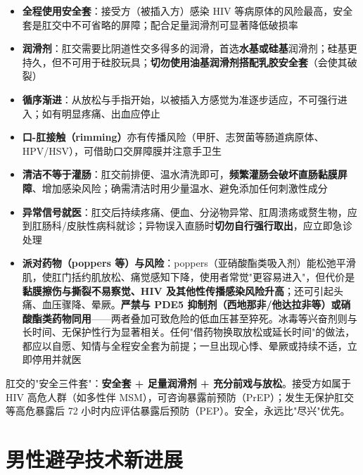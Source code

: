 \documentclass[12pt,a4paper,twoside]{ctexbook}
\begin{document}
\begin{itemize}[leftmargin=2cm]
	\item \textbf{全程使用安全套}：接受方（被插入方）感染 HIV 等病原体的风险最高，安全套是肛交中不可省略的屏障；配合足量润滑剂可显著降低破损率
	\item \textbf{润滑剂}：肛交需要比阴道性交多得多的润滑，首选\textbf{水基或硅基}润滑剂；硅基更持久，但不可用于硅胶玩具；\textbf{切勿使用油基润滑剂搭配乳胶安全套}（会使其破裂）
	\item \textbf{循序渐进}：从放松与手指开始，以被插入方感觉为准逐步适应，不可强行进入；如有明显疼痛、出血应停止
	\item \textbf{口-肛接触（rimming）}亦有传播风险（甲肝、志贺菌等肠道病原体、HPV/HSV），可借助口交屏障膜并注意手卫生
	\item \textbf{清洁不等于灌肠}：肛交前排便、温水清洗即可，\textbf{频繁灌肠会破坏直肠黏膜屏障}、增加感染风险；确需清洁时用少量温水、避免添加任何刺激性成分
	\item \textbf{异常信号就医}：肛交后持续疼痛、便血、分泌物异常、肛周溃疡或赘生物，应到肛肠科/皮肤性病科就诊；异物误入直肠时\textbf{切勿自行强行取出}，应立即急诊处理
	\item \textbf{派对药物（poppers 等）与风险}：poppers（亚硝酸酯类吸入剂）能松弛平滑肌，使肛门括约肌放松、痛觉感知下降，使用者常觉"更容易进入"，但代价是\textbf{黏膜擦伤与撕裂不易察觉、HIV 及其他性传播感染风险升高}；还可引起头痛、血压骤降、晕厥。\textbf{严禁与 PDE5 抑制剂（西地那非/他达拉非等）或硝酸酯类药物同用}——两者叠加可致危险的低血压甚至猝死。冰毒等兴奋剂则与长时间、无保护性行为显著相关。任何"借药物换取放松或延长时间"的做法，都应以自愿、知情与全程安全套为前提；一旦出现心悸、晕厥或持续不适，立即停用并就医
\end{itemize}

\begin{tcolorbox}[colback=pink!5!white,colframe=red!50!black,title=贴心小叮咛]
肛交的"安全三件套"：\textbf{安全套 + 足量润滑剂 + 充分前戏与放松}。接受方如属于 HIV 高危人群（如多性伴 MSM），可咨询暴露前预防（PrEP）；发生无保护肛交等高危暴露后 72 小时内应评估暴露后预防（PEP）。安全，永远比"尽兴"优先。
\end{tcolorbox}

\section{男性避孕技术新进展}
\end{document}
